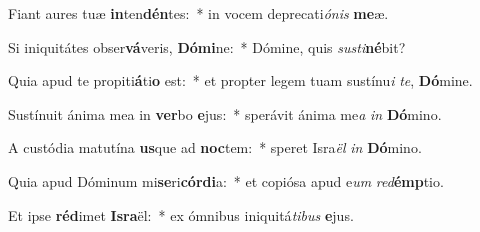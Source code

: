 \item Fiant aures tuæ \textbf{in}ten\textbf{dén}tes:~* in vocem deprecati\textit{ó}\textit{nis} \textbf{me}æ.
\item Si iniquitátes obser\textbf{vá}veris, \textbf{Dó}\textbf{mi}ne:~* Dómine, quis \textit{sus}\textit{ti}\textbf{né}bit?
\item Quia apud te propiti\textbf{á}ti\textbf{o} est:~* et propter legem tuam sustínu\textit{i} \textit{te}, \textbf{Dó}mine.
\item Sustínuit ánima mea in \textbf{ver}bo \textbf{e}jus:~* sperávit ánima me\textit{a} \textit{in} \textbf{Dó}mino.
\item A custódia matutína \textbf{us}que ad \textbf{noc}tem:~* speret Isra\textit{ël} \textit{in} \textbf{Dó}mino.
\item Quia apud Dóminum mi\textbf{se}ri\textbf{cór}\textbf{di}a:~* et copiósa apud e\textit{um} \textit{red}\textbf{émp}tio.
\item Et ipse \textbf{réd}imet \textbf{Is}\textbf{ra}ël:~* ex ómnibus iniquitá\textit{ti}\textit{bus} \textbf{e}jus.
